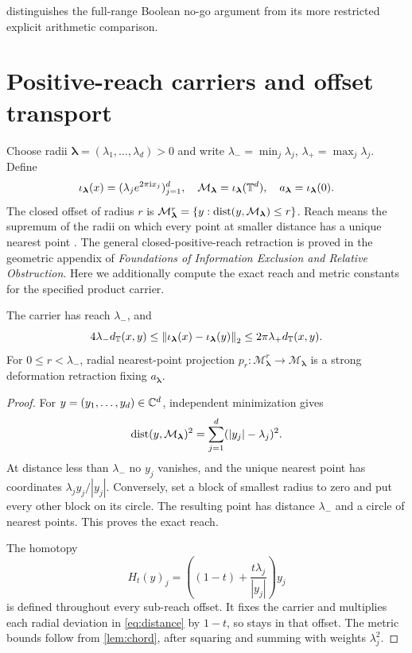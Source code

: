 \documentclass[11pt,a4paper]{article}
\begin{document}
 distinguishes the full-range Boolean no-go
argument from its more restricted explicit arithmetic comparison.


\section{Positive-reach carriers and offset transport}
\label{sec:carriers}

Choose radii $\boldsymbol\lambda=(\lambda_1,\ldots,\lambda_d)>0$ and
write $\lambda_- =\min_j\lambda_j$, $\lambda_+=\max_j\lambda_j$.
Define
\[
 \iota_{\boldsymbol\lambda}(x)
       =(\lambda_j e^{2\pi\mathrm i x_j})_{j=1}^d,
 \quad \mathcal M_{\boldsymbol\lambda}=\iota_{\boldsymbol\lambda}(\mathbb T^d),
 \quad a_{\boldsymbol\lambda}=\iota_{\boldsymbol\lambda}(0).
\]
The closed offset of radius $r$ is
$\mathcal M_{\boldsymbol\lambda}^r
 =\{y:\operatorname{dist}(y,\mathcal M_{\boldsymbol\lambda})\leq r\}$.
Reach means the supremum of the radii on which every point at smaller
distance has a unique nearest point \cite{federer}.  The general
closed-positive-reach retraction is proved in the geometric appendix of
\emph{Foundations of Information Exclusion and Relative Obstruction}.
Here we additionally compute the exact reach and metric constants for
the specified product carrier.

\begin{proposition}\label{prop:reach}
The carrier has reach $\lambda_-$, and
\[
 4\lambda_-d_{\mathbb T}(x,y)
 \leq\left\lVert\iota_{\boldsymbol\lambda}(x)-\iota_{\boldsymbol\lambda}(y)\right\rVert_2
 \leq2\pi\lambda_+d_{\mathbb T}(x,y).
\]
For $0\leq r<\lambda_-$, radial nearest-point projection
$p_r:\mathcal M_{\boldsymbol\lambda}^r\to\mathcal M_{\boldsymbol\lambda}$
is a strong deformation retraction fixing $a_{\boldsymbol\lambda}$.
\end{proposition}

\begin{proof}
For $y=(y_1,\ldots,y_d)\in\mathbb C^d$, independent minimization gives
\begin{equation}\label{eq:distance}
 \operatorname{dist}(y,\mathcal M_{\boldsymbol\lambda})^2
                  =\sum_{j=1}^d(|y_j|-\lambda_j)^2.
\end{equation}
At distance less than $\lambda_-$ no $y_j$ vanishes, and the unique
nearest point has coordinates $\lambda_j y_j/|y_j|$.  Conversely, set a
block of smallest radius to zero and put every other block on its circle.
The resulting point has distance $\lambda_-$ and a circle of nearest
points.  This proves the exact reach.

The homotopy
\[
 H_t(y)_j=\left((1-t)+\frac{t\lambda_j}{|y_j|}\right)y_j
\]
is defined throughout every sub-reach offset.  It fixes the carrier and
multiplies each radial deviation in \cref{eq:distance} by $1-t$, so stays
in that offset.  The metric bounds follow from \cref{lem:chord}, after
squaring and summing with weights $\lambda_j^2$.
\end{proof}
\end{document}
